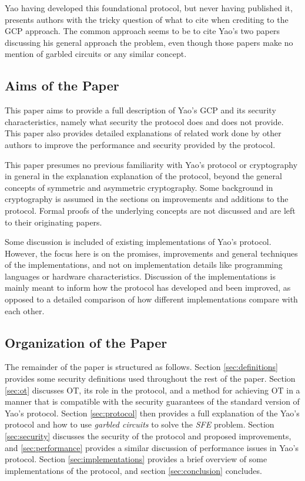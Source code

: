Yao having developed this foundational protocol, but never having published it, presents authors with the tricky question of what to cite when crediting to the \ac{GCP} approach.  The common approach seems to be to cite Yao's two papers discussing his general approach the problem, even though those papers make no mention of garbled circuits or any similar concept.

\subsection{Aims of the Paper}

This paper aims to provide a full description of Yao's \ac{GCP} and its security characteristics, namely what security the protocol does and does not provide.  This paper also provides detailed explanations of related work done by other authors to improve the performance and security provided by the protocol.

This paper presumes no previous familiarity with Yao's protocol or cryptography in general in the explanation explanation of the protocol, beyond the general concepts of symmetric and asymmetric cryptography.  Some background in cryptography is assumed in the sections on improvements and additions to the protocol.  Formal proofs of the underlying concepts are not discussed and are left to their originating papers.

Some discussion is included of existing implementations of Yao's protocol. However, the focus here is on the promises, improvements and general techniques of the implementations, and not on implementation details like programming languages or hardware characteristics. Discussion of the implementations is mainly meant to inform how the protocol has developed and been improved, as opposed to a detailed comparison of how different implementations compare with each other.
\pagebreak
\subsection{Organization of the Paper}

The remainder of the paper is structured as follows. Section \ref{sec:definitions} provides some security definitions used throughout the rest of the paper. Section \ref{sec:ot} discusses \ac{OT}, its role in the protocol, and a method for achieving \ac{OT} in a manner that is compatible with the security guarantees of the standard version of Yao's protocol.  Section \ref{sec:protocol} then provides a full explanation of the Yao's protocol and how to use \emph{garbled circuits} to solve the \emph{SFE} problem. Section \ref{sec:security} discusses the security of the protocol and proposed improvements, and \ref{sec:performance} provides a similar discussion of performance issues in Yao's protocol. Section \ref{sec:implementations} provides a brief overview of some implementations of the protocol, and section \ref{sec:conclusion} concludes.
